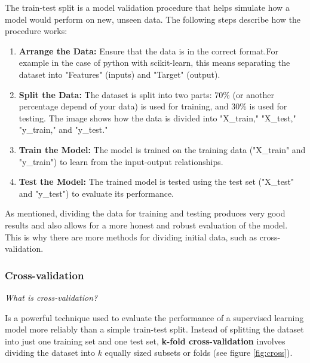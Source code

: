 \documentclass{llncs}
\begin{document}
\vspace{-20pt} %

The train-test split is a model validation procedure that helps simulate how a model would perform on new, unseen data. The following steps describe how the procedure works:

\begin{enumerate}
	\item \textbf{Arrange the Data:} Ensure that the data is in the correct format.For example in the case of python with scikit-learn, this means separating the dataset into "Features" (inputs) and "Target" (output).
	
	\item \textbf{Split the Data:} The dataset is split into two parts: 70\% (or another percentage depend of your data) is used for training, and 30\% is used for testing. The image shows how the data is divided into "X\_train," "X\_test," "y\_train," and "y\_test."
	
	\item \textbf{Train the Model:} The model is trained on the training data ("X\_train" and "y\_train") to learn from the input-output relationships.
	
	\item \textbf{Test the Model:} The trained model is tested using the test set ("X\_test" and "y\_test") to evaluate its performance.
\end{enumerate}

As mentioned, dividing the data for training and testing produces very good results and also allows for a more honest and robust evaluation of the model. This is why there are more methods for dividing initial data, such as cross-validation.

\subsubsection{Cross-validation}

\textit{What is cross-validation?}

Is a powerful technique used to evaluate the performance of a supervised learning model more reliably than a simple train-test split. Instead of splitting the dataset into just one training set and one test set, \textbf{k-fold cross-validation} involves dividing the dataset into \(k\) equally sized subsets or folds (see figure \ref{fig:cross}).
\end{document}
